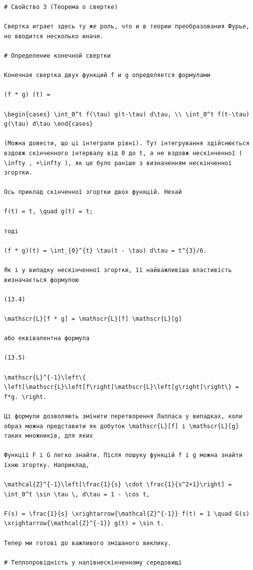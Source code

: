 \documentclass[
  ukrainian,
]{article}
\begin{document}
\begin{verbatim}
# Свойство 3 (Теорема о свертке)

Свертка играет здесь ту же роль, что и в теории преобразования Фурье, но вводится несколько иначе.

# Определение конечной свертки

Конечная свертка двух функций f и g определяется формулами

(f * g) (t) =

\begin{cases} \int_0^t f(\tau) g(t-\tau) d\tau, \\ \int_0^t f(t-\tau) g(\tau) d\tau \end{cases}

(Можна довести, що ці інтеграли рівні). Тут інтегрування здійснюється вздовж скінченного інтервалу від 0 до t, а не вздовж нескінченної ( \infty , +\infty ), як це було раніше з визначенням нескінченної згортки.

Ось приклад скінченної згортки двох функцій. Нехай

f(t) = t, \quad g(t) = t;

тоді

(f * g)(t) = \int_{0}^{t} \tau(t - \tau) d\tau = t^{3}/6.

Як і у випадку нескінченної згортки, її найважливіша властивість визначається формулою

(13.4)

\mathscr{L}[f * g] = \mathscr{L}[f] \mathscr{L}[g]

або еквівалентна формула

(13.5)

\mathscr{L}^{-1}\left\{ \left[\mathscr{L}\left[f\right]\mathscr{L}\left[g\right]\right\} = f*g. \right.

Ці формули дозволяють змінити перетворення Лапласа у випадках, коли образ можна представити як добуток \mathscr{L}[f] і \mathscr{L}[g] таких множників, для яких

Функції F і G легко знайти. Після пошуку функцій f і g можна знайти їхню згортку. Наприклад,

\mathcal{Z}^{-1}\left[\frac{1}{s} \cdot \frac{1}{s^2+1}\right] = \int_0^t \sin \tau \, d\tau = 1 - \cos t,

F(s) = \frac{1}{s} \xrightarrow{\mathcal{Z}^{-1}} f(t) = 1 \quad G(s) \xrightarrow{\mathcal{Z}^{-1}} g(t) = \sin t.

Тепер ми готові до важливого змішаного виклику.

# Теплопровідність у напівнескінченному середовищі


\end{verbatim}
\end{document}

